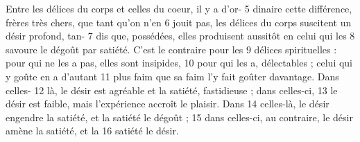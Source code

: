 Entre les délices du corps et celles du coeur, il y a d'or-	 
5	 	dinaire cette différence, frères très chers, que tant qu'on n'en	 
6	 	jouit pas, les délices du corps suscitent un désir profond, tan-	 
7	 	dis que, possédées, elles produisent aussitôt en celui qui les	 
8	 	savoure le dégoût par satiété. C'est le contraire pour les	 
9	 	délices spirituelles : pour qui ne les a pas, elles sont insipides,	 
10	 	pour qui les a, délectables ; celui qui y goûte en a d'autant	 
11	 	plus faim que sa faim l'y fait goûter davantage. Dans celles-	 
12	 	là, le désir est agréable et la satiété, fastidieuse ; dans celles-ci,	 
13	 	le désir est faible, mais l'expérience accroît le plaisir. Dans	 
14	 	celles-là, le désir engendre la satiété, et la satiété le dégoût ;	 
15	 	dans celles-ci, au contraire, le désir amène la satiété, et la	 
16	 	satiété le désir.